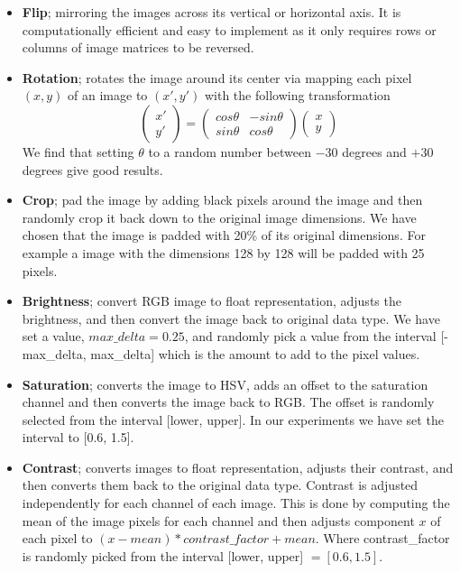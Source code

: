 \documentclass[thesis.tex]{subfiles}
\begin{document}
\begin{itemize}
\item \textbf{Flip}; mirroring the images across its vertical or horizontal axis. It is computationally efficient and easy to implement as it only requires rows or columns of image matrices to be reversed.
\item \textbf{Rotation}; rotates the image around its center via mapping each pixel $(x,y)$ of an image to $(x',y')$ with the following transformation
	\[ \begin{pmatrix} x' \\ y' \end{pmatrix} =
	\begin{pmatrix} cos \theta & -sin \theta \\ sin \theta & cos \theta \end{pmatrix}
	\begin{pmatrix} x \\ y \end{pmatrix} \]
We find that setting $\theta$ to a random number between $-30$ degrees and $+30$ degrees give good results.
\item \textbf{Crop}; pad the image by adding black pixels around the image and then randomly crop it back down to the original image dimensions. We have chosen that the image is padded with 20\% of its original dimensions. For example a image with the dimensions 128 by 128 will be padded with 25 pixels.
\item \textbf{Brightness}; convert RGB image to float representation, adjusts the brightness, and then convert the image back to original data type. We have set a value, $max\_delta=0.25$, and randomly pick a value from the interval [-max\_delta, max\_delta] which is the amount to add to the pixel values.
\item \textbf{Saturation}; converts the image to HSV, adds an offset to the saturation channel and then converts the image back to RGB. The offset is randomly selected from the interval [lower, upper]. In our experiments we have set the interval to [0.6, 1.5].
\item \textbf{Contrast}; converts images to float representation, adjusts their contrast, and then converts them back to the original data type. Contrast is adjusted independently for each channel of each image. This is done by computing the mean of the image pixels for each channel and then adjusts component $x$ of each pixel to $(x-mean)*contrast\_factor+mean$. Where contrast\_factor is randomly picked from the interval [lower, upper] $=[0.6, 1.5]$.
\end{itemize}
\end{document}
